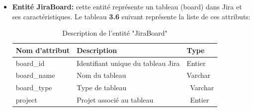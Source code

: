 \begin{itemize}
\begin{center}
\begin{longtable}{|p{3cm}|p{11cm}|p{2cm}|}
                \end{longtable}
               
        \end{center}
        \vspace{-1cm}
        \item \textbf{Entité JiraBoard:} cette entité représente un tableau (board) dans Jira et ses caractéristiques.
        Le tableau \textbf{3.6} suivant représente la liste de ces attributs:
        \begin{center}   
                \begin{longtable}{|p{3cm}|p{11cm}|p{2cm}|}
                    \caption {Description de l'entité "JiraBoard"} \\
                    \hline
                    \rowcolor{blue!18}\textbf{\large{Nom d'attribut}} & \textbf{\large{Description}} & \textbf{\large{Type}} \\
                    \hline
                    board\_id&  Identifiant unique du tableau Jira &  Entier\\\hline
                    board\_name& Nom du tableau& Varchar\\\hline
                    board\_type& Type de tableau &\ Varchar\\\hline
                    project& Projet associé au tableau&\ Entier\\\hline
                                    

                \end{longtable}
               

\end{center}
\end{itemize}
